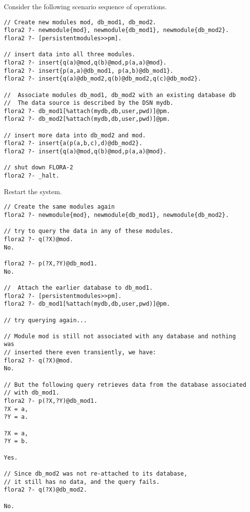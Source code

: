 Consider the following scenario sequence of operations.

\begin{verbatim}
// Create new modules mod, db_mod1, db_mod2.
flora2 ?- newmodule{mod}, newmodule{db_mod1}, newmodule{db_mod2}.
flora2 ?- [persistentmodules>>pm].

// insert data into all three modules.
flora2 ?- insert{q(a)@mod,q(b)@mod,p(a,a)@mod}.
flora2 ?- insert{p(a,a)@db_mod1, p(a,b)@db_mod1}.
flora2 ?- insert{q(a)@db_mod2,q(b)@db_mod2,q(c)@db_mod2}.

//  Associate modules db_mod1, db_mod2 with an existing database db
//  The data source is described by the DSN mydb.
flora2 ?- db_mod1[%attach(mydb,db,user,pwd)]@pm.
flora2 ?- db_mod2[%attach(mydb,db,user,pwd)]@pm.

// insert more data into db_mod2 and mod.
flora2 ?- insert{a(p(a,b,c),d)@db_mod2}.
flora2 ?- insert{q(a)@mod,q(b)@mod,p(a,a)@mod}.

// shut down FLORA-2
flora2 ?- _halt.
\end{verbatim}

\noindent
Restart the \FLORA system.

\begin{verbatim}
// Create the same modules again
flora2 ?- newmodule{mod}, newmodule{db_mod1}, newmodule{db_mod2}.

// try to query the data in any of these modules.
flora2 ?- q(?X)@mod.
No.

flora2 ?- p(?X,?Y)@db_mod1.
No.

//  Attach the earlier database to db_mod1.
flora2 ?- [persistentmodules>>pm].
flora2 ?- db_mod1[%attach(mydb,db,user,pwd)]@pm.

// try querying again...

// Module mod is still not associated with any database and nothing was
// inserted there even transiently, we have:
flora2 ?- q(?X)@mod.
No.

// But the following query retrieves data from the database associated
// with db_mod1.
flora2 ?- p(?X,?Y)@db_mod1.
?X = a,
?Y = a.

?X = a,
?Y = b.

Yes.

// Since db_mod2 was not re-attached to its database,
// it still has no data, and the query fails.
flora2 ?- q(?X)@db_mod2.

No.
\end{verbatim}



